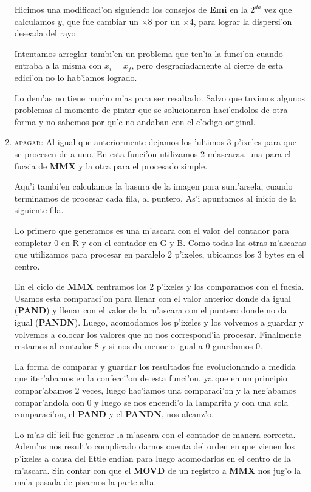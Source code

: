 \begin{enumerate}
Hicimos una modificaci'on siguiendo los consejos de \textbf{Emi} en la $2^{da}$
vez que calculamos $y$, que fue cambiar un $\times8$ por un $\times4$, para
lograr la dispersi'on deseada del rayo.

Intentamos arreglar tambi'en un problema que ten'ia la funci'on cuando entraba
a la misma con $x_i = x_f$, pero desgraciadamente al cierre de esta edici'on no
lo hab'iamos logrado.

Lo dem'as no tiene mucho m'as para ser resaltado. Salvo que tuvimos algunos
problemas al momento de pintar que se solucionaron haci'endolos de otra forma y
no sabemos por qu'e no andaban con el c'odigo original.

\item \textsc{apagar}:
Al igual que anteriormente dejamos los 'ultimos 3 p'ixeles para que se procesen
de a uno. En esta funci'on utilizamos 2 m'ascaras, una para el fucsia de
\textbf{MMX} y la otra para el procesado simple.

Aqu'i tambi'en calculamos la basura de la imagen para sum'arsela, cuando terminamos
de procesar cada fila, al puntero. As'i apuntamos al inicio de la siguiente fila.

Lo primero que generamos es una m'ascara con el valor del contador para
completar 0 en R y con el contador en G y B. Como todas las otras m'ascaras que
utilizamos para procesar en paralelo 2 p'ixeles, ubicamos los 3 bytes en el
centro.

En el ciclo de \textbf{MMX} centramos los 2 p'ixeles y los comparamos con el fucsia.
Usamos esta comparaci'on para llenar con el valor anterior donde da igual
(\textbf{PAND}) y llenar con el valor de la m'ascara con el puntero donde no da
igual (\textbf{PANDN}). Luego, acomodamos los p'ixeles y los volvemos a guardar
y volvemos a colocar los valores que no nos correspond'ia procesar.
Finalmente restamos al contador 8 y si nos da menor o igual a 0 guardamos 0.

La forma de comparar y guardar los resultados fue evolucionando a medida que
iter'abamos en la confecci'on de esta funci'on, ya que en un principio
compar'abamos 2 veces, luego hac'iamos una comparaci'on y la neg'abamos
compar'andola con 0 y luego se nos encendi'o la lamparita y con una sola
comparaci'on, el \textbf{PAND} y el \textbf{PANDN}, nos alcanz'o.

Lo m'as dif'icil fue generar la m'ascara con el contador de manera correcta.
Adem'as  nos result'o complicado darnos cuenta del orden en que vienen los
p'ixeles a causa del little endian para luego acomodarlos en el centro de la
m'ascara. Sin contar con que el \textbf{MOVD} de un registro a \textbf{MMX} nos
jug'o la mala pasada de pisarnos la parte alta.

\end{enumerate}

